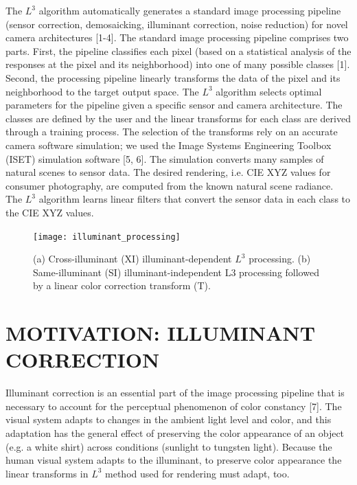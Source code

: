 \documentclass[]{spie}
\begin{document}
The $L^3$ algorithm automatically generates a standard image processing pipeline (sensor correction, demosaicking, illuminant correction, noise reduction) for novel camera architectures  [1-4]. The standard image processing pipeline comprises two parts. First, the pipeline classifies each pixel (based on a statistical analysis of the responses at the pixel and its neighborhood) into one of many possible classes [1].  Second, the processing pipeline linearly transforms the data of the pixel and its neighborhood to the target output space.  The $L^3$ algorithm selects optimal parameters for the pipeline given a specific sensor and camera architecture. 
The classes are defined by the user and the linear transforms for each class are derived through a training process.  The selection of the transforms rely on an accurate camera software simulation; we used the Image Systems Engineering Toolbox (ISET) simulation software [5, 6]. The simulation converts many samples of natural scenes to sensor data. The desired rendering, i.e. CIE XYZ values for consumer photography, are computed from the known natural scene radiance. The $L^3$ algorithm learns linear filters that convert the sensor data in each class to the CIE XYZ values. 

\begin{figure}
\begin{center}
    \texttt{[image: illuminant\_processing]}
\end{center}
\caption{ (a) Cross-illuminant (XI) illuminant-dependent $L^3$ processing. (b) Same-illuminant (SI) illuminant-independent L3 processing  followed by a linear color correction transform (T).}
\label{fig:sensordisplay}
\end{figure}

\section{MOTIVATION: ILLUMINANT CORRECTION}

Illuminant correction is an essential part of the image processing pipeline that is necessary to account for the perceptual phenomenon of color constancy [7]. The visual system adapts to changes in the ambient light level and color, and this adaptation has the general effect of preserving the color appearance of an object (e.g. a white shirt) across conditions (sunlight to tungsten light). Because the human visual system adapts to the illuminant, to preserve color appearance the linear transforms in $L^3$  method used for rendering must adapt, too. 
\end{document}
